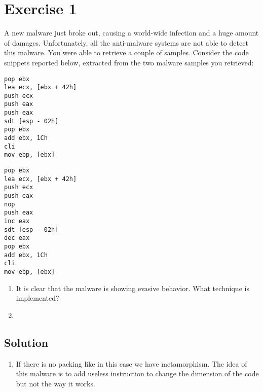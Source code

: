 \section{Exercise 1}

A new malware just broke out, causing a world-wide infection and a huge amount of damages. 
Unfortunately, all the anti-malware systems are not able to detect this malware. 
You were able to retrieve a couple of samples.
Consider the code snippets reported below, extracted from the two malware samples you retrieved:
\begin{verbatim}
pop ebx
lea ecx, [ebx + 42h]
push ecx
push eax
push eax
sdt [esp - 02h]
pop ebx
add ebx, 1Ch
cli
mov ebp, [ebx]
\end{verbatim}

\begin{verbatim}
pop ebx
lea ecx, [ebx + 42h]
push ecx
push eax
nop
push eax
inc eax
sdt [esp - 02h]
dec eax
pop ebx
add ebx, 1Ch
cli
mov ebp, [ebx]
\end{verbatim}
\begin{enumerate}
    \item It is clear that the malware is showing evasive behavior. 
        What technique is implemented?
    \item 
\end{enumerate}

\subsection*{Solution}
\begin{enumerate}
    \item If there is no packing like in this case we have metamorphism. 
        The idea of this malware is to add useless instruction to change the dimension of the code but not the way it works. 
\end{enumerate}